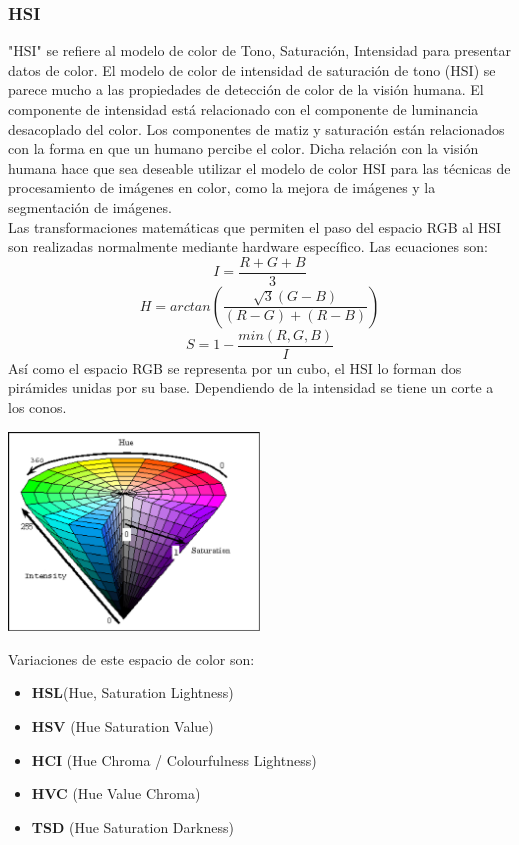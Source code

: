\subsubsection{HSI}
"HSI" se refiere al modelo de color de Tono, Saturación, Intensidad para presentar datos 
de color. El modelo de color de intensidad de saturación de tono (HSI) se parece mucho 
a las propiedades de detección de color de la visión humana. El componente de intensidad 
está relacionado con el componente de luminancia desacoplado del color. Los componentes 
de matiz y saturación están relacionados con la forma en que un humano percibe el color. 
Dicha relación con la visión humana hace que sea deseable utilizar el modelo de color 
HSI para las técnicas de procesamiento de imágenes en color, como la mejora de imágenes 
y la segmentación de imágenes.\cite{taiy2000}\\
Las transformaciones matemáticas que permiten el paso del espacio RGB al HSI
son realizadas normalmente mediante hardware específico. Las ecuaciones son:
\begin{equation}
    I=\frac{R+G+B}{3}    
\end{equation}
\begin{equation}
    H = arctan \left( \frac{\sqrt{3}(G-B)}{(R-G)+(R-B)} \right)
\end{equation}
\begin{equation}
    S = 1 - \frac{min(R,G,B)}{I}
\end{equation}
Así como el espacio RGB se representa por un cubo, el HSI lo forman dos
pirámides unidas por su base. Dependiendo de la intensidad se tiene un corte a los
conos.
\begin{center}
    \includegraphics[width=0.5\textwidth]{Capitulo2/Fig11.eps}
    \label{Fig10}
\end{center}
Variaciones de este espacio de color son:
\begin{itemize}
    \item \textbf{HSL}(Hue, Saturation Lightness)
    \item \textbf{HSV} (Hue Saturation Value)
    \item \textbf{HCI} (Hue Chroma / Colourfulness Lightness)
    \item \textbf{HVC} (Hue Value Chroma)
    \item \textbf{TSD} (Hue Saturation Darkness)
\end{itemize}

